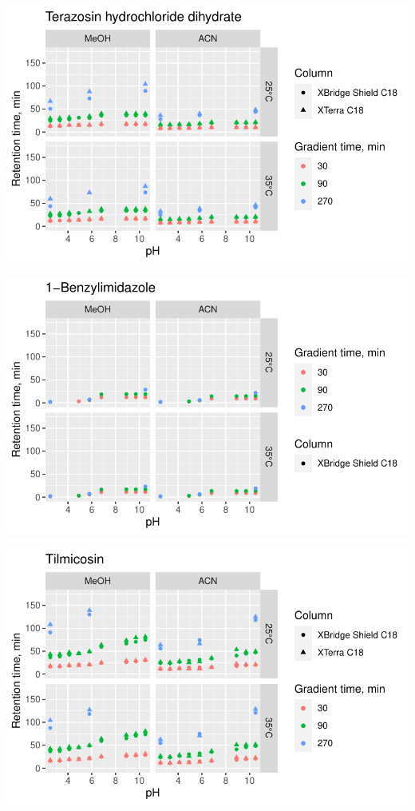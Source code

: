 \documentclass[
  letterpaper,
  DIV=11,
  numbers=noendperiod]{scrreprt}
\begin{document}
\includegraphics{index_files/figure-pdf/unnamed-chunk-4-132.pdf}

\includegraphics{index_files/figure-pdf/unnamed-chunk-4-133.pdf}

\includegraphics{index_files/figure-pdf/unnamed-chunk-4-134.pdf}
\end{document}
